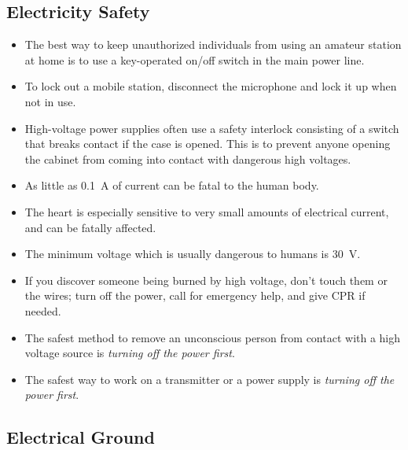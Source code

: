 \documentclass[letterpaper,12pt]{scrartcl}
\begin{document}
\subsection{Electricity Safety}

\begin{itemize}
\item The best way to keep unauthorized individuals from using an amateur station at home is to use a key-operated on/off switch in the main power line.
\item To lock out a mobile station, disconnect the microphone and lock it up when not in use.
\item High-voltage power supplies often use a safety interlock consisting of a switch that breaks contact if the case is opened. This is to prevent
anyone opening the cabinet from coming into contact with dangerous high voltages.
\item As little as 0.1~A of current can be fatal to the human body.
\item The heart is especially sensitive to very small amounts of electrical current, and can be fatally affected.
\item The minimum voltage which is usually dangerous to humans is 30~V.
\item If you discover someone being burned by high voltage, don't touch them or the wires; turn off the power, call for emergency help,
and give CPR if needed.
\item The safest method to remove an unconscious person from contact with a high voltage source is \textit{turning off the power first}.
\item The safest way to work on a transmitter or a power supply is \textit{turning off the power first}.
\end{itemize}

\subsection{Electrical Ground}
\end{document}
